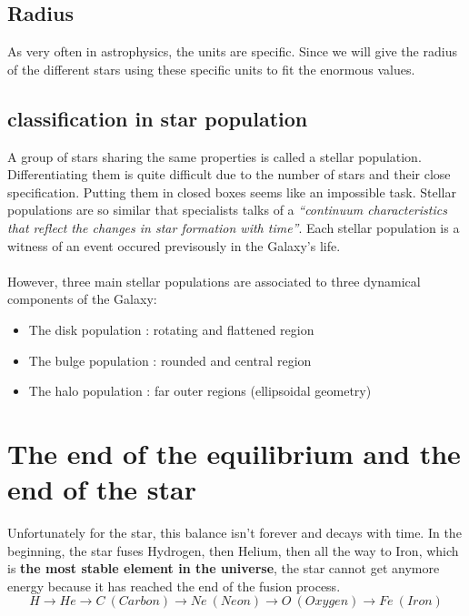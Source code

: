 \documentclass[a4paper, 11pt]{article} %
\begin{document}
\subsection{Radius}

As very often in astrophysics, the units are specific. Since we will give the radius of the different stars using these specific units to fit the enormous values.


\subsection{classification in star population}

A group of stars sharing the same properties is called a stellar population. 
Differentiating them is quite difficult due to the number of stars and their close specification. Putting them in closed boxes seems like an impossible task. Stellar populations are so similar that specialists talks of a \textit{``continuum characteristics that reflect the changes in star formation with time''}. Each stellar population is a witness of an event occured previsously in the Galaxy's life.




\paragraph*{}
However, three main stellar populations are associated to three dynamical components of the Galaxy:


\begin{itemize}
 \item The disk population : rotating and flattened region
\item The bulge population : rounded and central region
\item The halo population : far outer regions (ellipsoidal geometry)

\end{itemize}



\section{The end of the equilibrium and the end of the star}

Unfortunately for the star, this balance isn't forever and decays with time. In the beginning, the star fuses Hydrogen, then Helium, then all the way to Iron, which is \textbf{the most stable element in the universe}, the star cannot get anymore energy because it has reached the end of the fusion process.
\begin{equation}
H \rightarrow He \rightarrow C\ (Carbon) \rightarrow Ne\ (Neon)\rightarrow O\ (Oxygen)\rightarrow Fe\ (Iron)
\end{equation}
\end{document}
